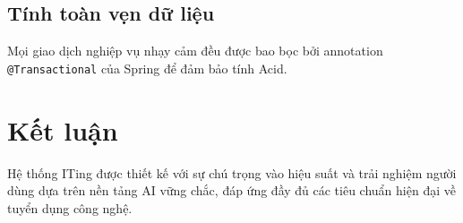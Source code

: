 \documentclass[12pt, a4paper]{report}
\begin{document}
\section{Tính toàn vẹn dữ liệu}
Mọi giao dịch nghiệp vụ nhạy cảm đều được bao bọc bởi annotation \texttt{@Transactional} của Spring để đảm bảo tính Acid.

\chapter{Kết luận}
Hệ thống ITing được thiết kế với sự chú trọng vào hiệu suất và trải nghiệm người dùng dựa trên nền tảng AI vững chắc, đáp ứng đầy đủ các tiêu chuẩn hiện đại về tuyển dụng công nghệ.
\end{document}
